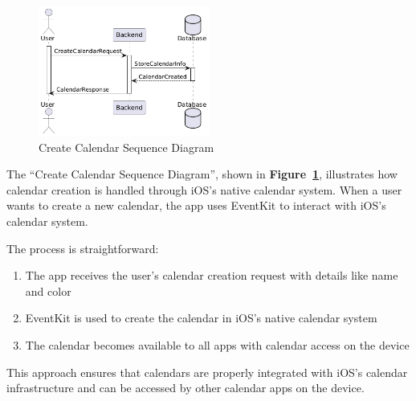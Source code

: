 \begin{figure}[!h]
    \centering
    \includegraphics[width=0.5\textwidth]{images/docs/diagrams/sequence-diagrams/all-sequence-diagrams/Create Calendar.png}
    \caption{Create Calendar Sequence Diagram}
    \label{fig:seq/create-calendar}
\end{figure}

The ``Create Calendar Sequence Diagram'', shown in \textbf{Figure~\ref{fig:seq/create-calendar}}, illustrates how calendar creation is handled through iOS's native calendar system. When a user wants to create a new calendar, the app uses EventKit to interact with iOS's calendar system.

The process is straightforward:
\begin{enumerate}
    \item The app receives the user's calendar creation request with details like name and color
    \item EventKit is used to create the calendar in iOS's native calendar system
    \item The calendar becomes available to all apps with calendar access on the device
\end{enumerate}

This approach ensures that calendars are properly integrated with iOS's calendar infrastructure and can be accessed by other calendar apps on the device.